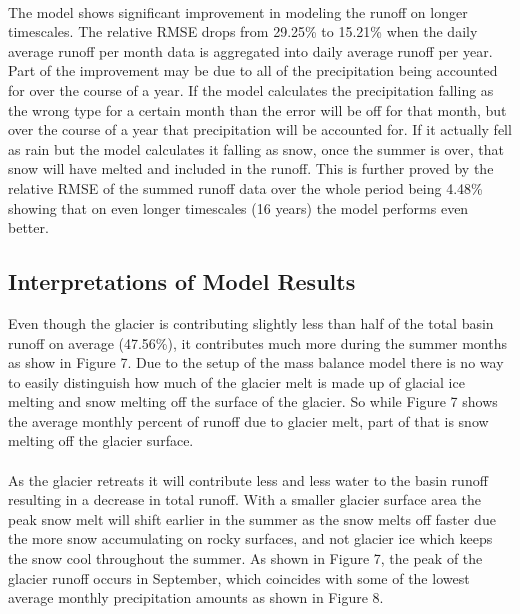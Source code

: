 \documentclass{article}
\begin{document}
\paragraph{}
The model shows significant improvement in modeling the runoff on longer timescales. The relative RMSE drops from 29.25\% to 15.21\% when the 
daily average runoff per month data is aggregated into daily average runoff per year. Part of the improvement may be due to all of the 
precipitation being accounted for over the course of a year. If the model calculates the precipitation falling as the wrong type for a certain 
month than the error will be off for that month, but over the course of a year that precipitation will be accounted for. If it actually fell as 
rain but the model calculates it falling as snow, once the summer is over, that snow will have melted and included in the runoff. This is further 
proved by the relative RMSE of the summed runoff data over the whole period being 4.48\% showing that on even longer timescales (16 years) the model 
performs even better.  
\subsection{Interpretations of Model Results}
Even though the glacier is contributing slightly less than half of the total basin runoff on average (47.56\%), it contributes much more during the summer 
months as show in Figure 7. Due to the setup of the mass balance model there is no way to easily distinguish how much of the glacier melt is made 
up of glacial ice melting and snow melting off the surface of the glacier. So while Figure 7 shows the average monthly percent of runoff due to glacier 
melt, part of that is snow melting off the glacier surface. 
\paragraph{}
As the glacier retreats it will contribute less and less water to the basin runoff resulting in a decrease in total runoff. With a smaller glacier 
surface area the peak snow melt will shift earlier in the summer as the snow melts off faster due the more snow accumulating on rocky surfaces, and not glacier 
ice which keeps the snow cool throughout the summer. As shown in Figure 7, the peak of the glacier runoff occurs in September, which coincides 
with some of the lowest average monthly precipitation amounts as shown in Figure 8.
\end{document}
